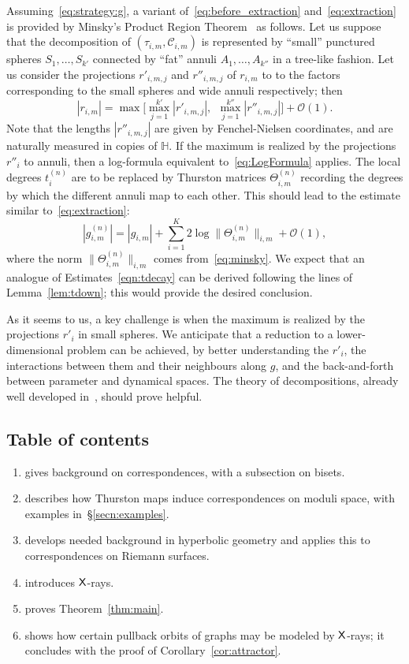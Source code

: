\documentclass{amsart}
\theoremstyle{definition}
\theoremstyle{remark}
\newcommand{\sfX}{{\sf X}}
\begin{document}
Assuming~\eqref{eq:strategy:g}, a variant of~\eqref{eq:before_extraction} and~\eqref{eq:extraction} is provided by Minsky's Product Region Theorem~\cite{MR1390649} as follows. Let us suppose that the decomposition of $(\tau_{i,m}, \mathscr C_{i,m})$ is represented by ``small'' punctured spheres $S_1,\dots,S_{k'}$ connected by ``fat'' annuli $A_1,\dots,A_{k''}$ in a tree-like fashion. Let us consider the projections $r'_{i,m,j}$ and $r''_{i,m,j}$ of $r_{i,m}$ to  to the factors corresponding to the small spheres and wide annuli respectively; then
\begin{equation}\label{eq:minsky}
  |r_{i,m}|=\max\Big[\max_{j=1}^{k'}|r'_{i,m,j}|,\ \  \max_{j=1}^{k''}|r''_{i,m,j}|\Big]+\mathcal O(1).
\end{equation}
Note that the lengths $|r''_{i,m,j}|$ are given by Fenchel-Nielsen coordinates, and are naturally measured in copies of $\mathbb H$. If the maximum is realized by the projections $r''_i$ to annuli, then a log-formula equivalent to~\eqref{eq:LogFormula} applies. The local degrees $t_i^{(n)}$ are to be replaced by Thurston matrices $\Theta^{(n)}_{i,m}$ recording the degrees by which the different annuli map to each other. This should lead to the estimate similar to~\eqref{eq:extraction}:
\[|g^{(n)}_{i,m}|=|g_{i,m}|+\sum_{i=1}^{K} 2\log\|\Theta_{i,m}^{(n)}\|_{i,m}+\mathcal O(1),\]
where the norm $\|\Theta_{i,m}^{(n)}\|_{i,m}$ comes from~\eqref{eq:minsky}. We expect that an analogue of Estimates~\eqref{eqn:tdecay} can be derived following the lines of Lemma~\ref{lem:tdown}; this would provide the desired conclusion.

As it seems to us, a key challenge is when the maximum is realized by the projections $r'_i$ in small spheres. We anticipate that a reduction to a lower-dimensional problem can be achieved, by better understanding the $r'_i$, the interactions between them and their neighbours along $g$, and the back-and-forth between parameter and dynamical spaces. The theory of decompositions, already well developed in~\cites{MR2020454,MR4213769}, should prove helpful.

\subsection{Table of contents}
\begin{enumerate}
\item[\S\ref{secn:correspondences}] gives background on correspondences, with a subsection on bisets.
\item[\S\ref{subsec:thmap}] describes how Thurston maps induce correspondences on moduli space, with examples in~\S\ref{secn:examples}.
\item[\S\ref{secn:hyperbolic}] develops needed background in hyperbolic geometry and applies this to correspondences on Riemann surfaces.
\item[\S\ref{secn:xrays}] introduces $\sfX$-rays.
\item[\S\ref{secn:proof}] proves Theorem~\ref{thm:main}.
\item[\S\ref{ss:gga}] shows how certain pullback orbits of graphs may be modeled by $\sfX$-rays; it concludes with the proof of Corollary~\ref{cor:attractor}.
\end{enumerate}
\end{document}
